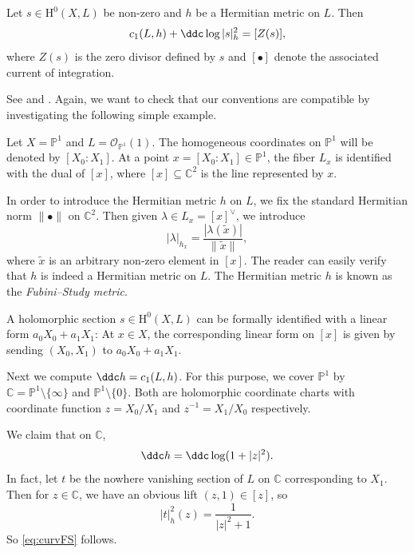 \begin{proposition}\label{prop:LelongPoincare}
    Let $s\in \mathrm{H}^0(X,L)$ be non-zero and $h$ be a Hermitian metric on $L$. Then
    \begin{equation}\label{eq:LP}
        c_1(L,h)+\ddc \log|s|_h^2=[Z(s)],
    \end{equation}
    where $Z(s)$ is the zero divisor defined by $s$ and $[\bullet]$ denote the associated current of integration.
\end{proposition}
See \cite[(3.11)]{Dem12} and \cite[Proposition~14.5.4]{FPT}. Again, we want to check that our conventions are compatible by investigating the following simple example.
\begin{example}\label{ex:LPP1}
    Let $X=\mathbb{P}^1$ and $L=\mathcal{O}_{\mathbb{P}^1}(1)$. The homogeneous coordinates on $\mathbb{P}^1$ will be denoted by $[X_0:X_1]$. At a point $x=[X_0:X_1]\in \mathbb{P}^1$, the fiber $L_x$ is identified with the dual of $[x]$, where $[x]\subseteq \mathbb{C}^2$ is the line represented by $x$.

    In order to introduce the Hermitian metric $h$ on $L$, we fix the standard Hermitian norm $\|\bullet\|$ on $\mathbb{C}^2$. Then given $\lambda\in L_x=[x]^{\vee}$, we introduce
    \[
    |\lambda|_{h_x}=\frac{|\lambda (\tilde{x})|}{\|\tilde{x}\|},
    \]
    where $\tilde{x}$ is an arbitrary non-zero element in $[x]$. The reader can easily verify that $h$ is indeed a Hermitian metric on $L$.
    The Hermitian metric $h$ is known as the \emph{Fubini--Study metric}.

    A holomorphic section $s\in \mathrm{H}^0(X,L)$ can be formally identified with a linear form $a_0X_0+a_1X_1$: At $x\in X$, the corresponding linear form on $[x]$ is given by sending $(X_0,X_1)$ to $a_0X_0+a_1X_1$.

    Next we compute $\ddc h=c_1(L,h)$. For this purpose, we cover $\mathbb{P}^1$ by $\mathbb{C}=\mathbb{P}^1\setminus \{\infty\}$ and $\mathbb{P}^1\setminus \{0\}$.
    Both are holomorphic coordinate charts with coordinate function $z=X_0/X_1$ and $z^{-1}=X_1/X_0$ respectively.

    We claim that on $\mathbb{C}$,
    \begin{equation}\label{eq:curvFS}
        \ddc h=\ddc \log (1+|z|^2).
    \end{equation}
    In fact, let $t$ be the nowhere vanishing section of $L$ on $\mathbb{C}$ corresponding to $X_1$. Then for $z\in \mathbb{C}$, we have an obvious lift $(z,1)\in [z]$, so
    \[
    |t|_h^2(z)=\frac{1}{|z|^2+1}.
    \]
    So \eqref{eq:curvFS} follows.


\end{example}
